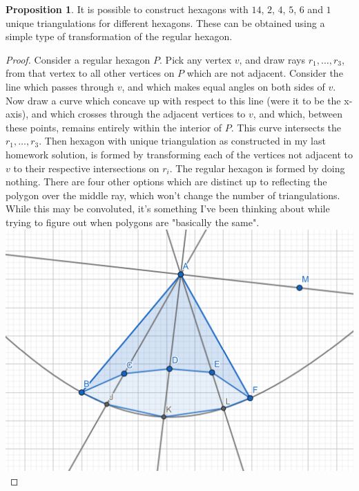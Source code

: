 \documentclass[12pt]{article}
\theoremstyle{definition}
\newtheorem{proposition}{Proposition}
\begin{document}
\begin{proposition}
It is possible to construct hexagons with $14$, $2$, $4$, $5$, $6$ and $1$ unique triangulations for different hexagons. These can be obtained using a simple type of transformation of the regular hexagon. 
\end{proposition}

\begin{proof}
Consider a regular hexagon $P$. Pick any vertex $v$, and draw rays $r_1,\dots,r_3$, from that vertex to all other vertices on $P$ which are not adjacent. Consider the line which passes through $v$, and which makes equal angles on both sides of $v$. Now draw a curve which concave up with respect to this line (were it to be the x-axis), and which crosses through the adjacent vertices to $v$, and which, between these points, remains entirely within the interior of $P$. This curve intersects the $r_1,\dots, r_3$. Then hexagon with unique triangulation as constructed in my last homework solution, is formed by transforming each of the vertices not adjacent to $v$ to their respective intersections on $r_i$.  The regular hexagon is formed by doing nothing. There are four other options which are distinct up to reflecting the polygon over the middle ray, which won't change the number of triangulations. While this may be convoluted, it's something I've been thinking about while trying to figure out when polygons are "basically the same".\\

\includegraphics[scale=1]{transformation_2.png} 



\end{proof}
\end{document}
